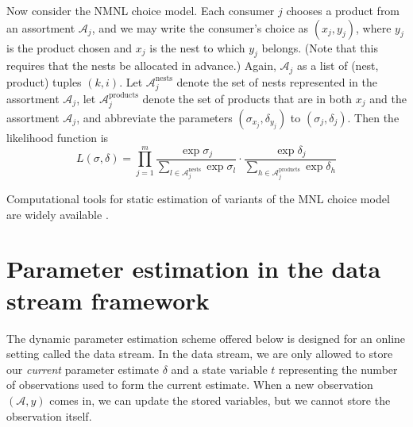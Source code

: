 \documentclass[preprint,12pt,authoryear]{elsarticle}
\begin{document}
Now consider the NMNL choice model. Each consumer $j$ chooses a product from an assortment $\mathcal{A}_j$, and we may write the consumer's choice as $(x_j, y_j)$, where $y_j$ is the product chosen and $x_j$ is the nest to which $y_j$ belongs. (Note that this requires that the nests be allocated in advance.) Again, $\mathcal{A}_j$ as a list of (nest, product) tuples $(k, i)$. Let $\mathcal{A}_j^{\text{nests}}$ denote the set of nests represented in the assortment $\mathcal{A}_j$, let $\mathcal{A}_{j}^{\text{products}}$ denote the set of products that are in both $x_j$ and the assortment $\mathcal{A}_j$, and abbreviate the parameters $(\sigma_{x_j}, \delta_{y_j})$ to $(\sigma_j, \delta_j)$. Then the likelihood function is
\begin{equation}L(\sigma, \delta) = \prod_{j=1}^m \frac{\exp \sigma_j}{\sum_{l\in \mathcal{A}_j^{\text{nests}}} \exp \sigma_l} \cdot \frac{\exp \delta_j}{\sum_{h \in \mathcal{A}_{j}^{\text{products}}} \exp \delta_h}\end{equation}

Computational tools for static estimation of variants of the MNL choice model are widely available \cite[e.g.][]{croissantnd}. 

\section{Parameter estimation in the data stream framework}
The dynamic parameter estimation scheme offered below is designed for an online setting called the data stream. In the data stream, we are only allowed to store our \emph{current} parameter estimate $\delta$ and a state variable $t$ representing the number of observations used to form the current estimate. When a new observation $(\mathcal{A}, y)$ comes in, we can update the stored variables, but we cannot store the observation itself. %
\end{document}
